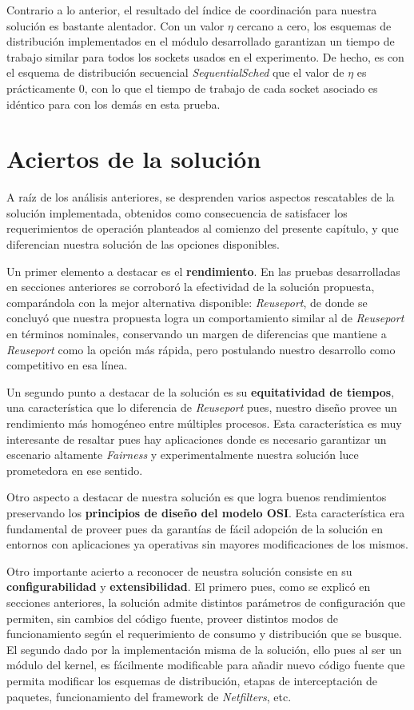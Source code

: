 Contrario a lo anterior, el resultado del índice de coordinación para nuestra solución es bastante alentador. Con un valor $\eta$ cercano a cero, los esquemas de distribución implementados en el módulo desarrollado garantizan un tiempo de trabajo similar para todos los sockets usados en el experimento. De hecho, es con el esquema de distribución secuencial \emph{SequentialSched} que el valor de $\eta$ es prácticamente 0, con lo que el tiempo de trabajo de cada socket asociado es idéntico para con los demás en esta prueba.


\section{Aciertos de la solución}

A raíz de los análisis anteriores, se desprenden varios aspectos rescatables de la solución implementada, obtenidos como consecuencia de satisfacer los requerimientos de operación planteados al comienzo del presente capítulo, y que diferencian nuestra solución de las opciones disponibles.

Un primer elemento a destacar es el \textbf{rendimiento}. En las pruebas desarrolladas en secciones anteriores se corroboró la efectividad de la solución propuesta, comparándola con la mejor alternativa disponible: \emph{Reuseport}, de donde se concluyó que nuestra propuesta logra un comportamiento similar al de \emph{Reuseport} en términos nominales, conservando un margen de diferencias que mantiene a \emph{Reuseport} como la opción más rápida, pero postulando nuestro desarrollo como competitivo en esa línea.

Un segundo punto a destacar de la solución es su \textbf{equitatividad de tiempos}, una característica que lo diferencia de \emph{Reuseport} pues, nuestro diseño provee un rendimiento más homogéneo entre múltiples procesos. Esta característica es muy interesante de resaltar pues hay aplicaciones donde es necesario garantizar un escenario altamente \emph{Fairness} y experimentalmente nuestra solución luce prometedora en ese sentido.

Otro aspecto a destacar de nuestra solución es que logra buenos rendimientos preservando los \textbf{principios de diseño del modelo OSI}. Esta característica era fundamental de proveer pues da garantías de fácil adopción de la solución en entornos con aplicaciones ya operativas sin mayores modificaciones de los mismos.

Otro importante acierto a reconocer de neustra solución consiste en su \textbf{configurabilidad} y \textbf{extensibilidad}. El primero pues, como se explicó en secciones anteriores, la solución admite distintos parámetros de configuración que permiten, sin cambios del código fuente, proveer distintos modos de funcionamiento según el requerimiento de consumo y distribución que se busque. El segundo dado por la implementación misma de la solución, ello pues al ser un módulo del kernel, es fácilmente modificable para añadir nuevo código fuente que permita modificar los esquemas de distribución, etapas de interceptación de paquetes, funcionamiento del framework de \emph{Netfilters}, etc.

